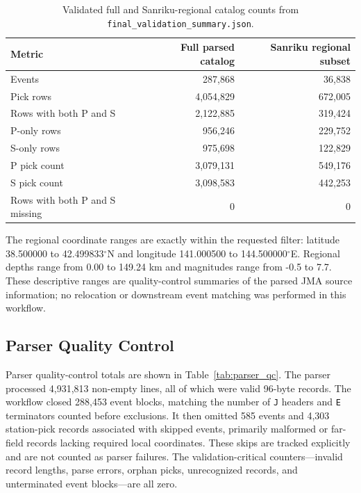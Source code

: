 \documentclass[11pt]{article}
\begin{document}
\begin{table}[htbp]
\centering
\caption{Validated full and Sanriku-regional catalog counts from \texttt{final\_validation\_summary.json}.}
\label{tab:catalog_counts}
\small
\begin{tabular}{lrr}
\toprule
Metric & Full parsed catalog & Sanriku regional subset \\
\midrule
Events & 287,868 & 36,838 \\
Pick rows & 4,054,829 & 672,005 \\
Rows with both P and S & 2,122,885 & 319,424 \\
P-only rows & 956,246 & 229,752 \\
S-only rows & 975,698 & 122,829 \\
P pick count & 3,079,131 & 549,176 \\
S pick count & 3,098,583 & 442,253 \\
Rows with both P and S missing & 0 & 0 \\
\bottomrule
\end{tabular}
\end{table}

The regional coordinate ranges are exactly within the requested filter: latitude 38.500000 to 42.499833\(^{\circ}\)N and longitude 141.000500 to 144.500000\(^{\circ}\)E.  Regional depths range from 0.00 to 149.24 km and magnitudes range from -0.5 to 7.7.  These descriptive ranges are quality-control summaries of the parsed JMA source information; no relocation or downstream event matching was performed in this workflow.

\subsection{Parser Quality Control}

Parser quality-control totals are shown in Table~\ref{tab:parser_qc}.  The parser processed 4,931,813 non-empty lines, all of which were valid 96-byte records.  The workflow closed 288,453 event blocks, matching the number of \texttt{J} headers and \texttt{E} terminators counted before exclusions.  It then omitted 585 events and 4,303 station-pick records associated with skipped events, primarily malformed or far-field records lacking required local coordinates.  These skips are tracked explicitly and are not counted as parser failures.  The validation-critical counters---invalid record lengths, parse errors, orphan picks, unrecognized records, and unterminated event blocks---are all zero.
\end{document}
